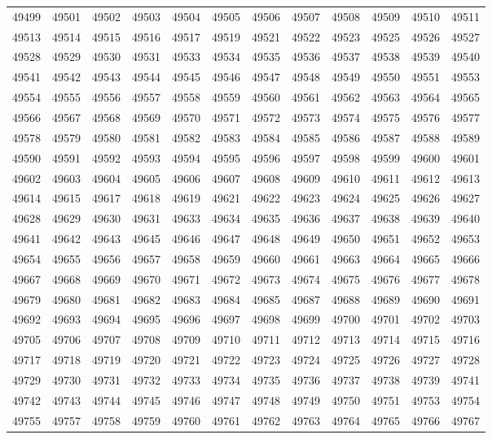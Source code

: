 \begin{center}
\begin{longtable}{llllllllllll}
49499 &49501 &49502 &49503 &49504 &49505 &49506 &49507 &49508 &49509 &49510 &49511 \\
49513 &49514 &49515 &49516 &49517 &49519 &49521 &49522 &49523 &49525 &49526 &49527 \\
49528 &49529 &49530 &49531 &49533 &49534 &49535 &49536 &49537 &49538 &49539 &49540 \\
49541 &49542 &49543 &49544 &49545 &49546 &49547 &49548 &49549 &49550 &49551 &49553 \\
49554 &49555 &49556 &49557 &49558 &49559 &49560 &49561 &49562 &49563 &49564 &49565 \\
49566 &49567 &49568 &49569 &49570 &49571 &49572 &49573 &49574 &49575 &49576 &49577 \\
49578 &49579 &49580 &49581 &49582 &49583 &49584 &49585 &49586 &49587 &49588 &49589 \\
49590 &49591 &49592 &49593 &49594 &49595 &49596 &49597 &49598 &49599 &49600 &49601 \\
49602 &49603 &49604 &49605 &49606 &49607 &49608 &49609 &49610 &49611 &49612 &49613 \\
49614 &49615 &49617 &49618 &49619 &49621 &49622 &49623 &49624 &49625 &49626 &49627 \\
49628 &49629 &49630 &49631 &49633 &49634 &49635 &49636 &49637 &49638 &49639 &49640 \\
49641 &49642 &49643 &49645 &49646 &49647 &49648 &49649 &49650 &49651 &49652 &49653 \\
49654 &49655 &49656 &49657 &49658 &49659 &49660 &49661 &49663 &49664 &49665 &49666 \\
49667 &49668 &49669 &49670 &49671 &49672 &49673 &49674 &49675 &49676 &49677 &49678 \\
49679 &49680 &49681 &49682 &49683 &49684 &49685 &49687 &49688 &49689 &49690 &49691 \\
49692 &49693 &49694 &49695 &49696 &49697 &49698 &49699 &49700 &49701 &49702 &49703 \\
49705 &49706 &49707 &49708 &49709 &49710 &49711 &49712 &49713 &49714 &49715 &49716 \\
49717 &49718 &49719 &49720 &49721 &49722 &49723 &49724 &49725 &49726 &49727 &49728 \\
49729 &49730 &49731 &49732 &49733 &49734 &49735 &49736 &49737 &49738 &49739 &49741 \\
49742 &49743 &49744 &49745 &49746 &49747 &49748 &49749 &49750 &49751 &49753 &49754 \\
49755 &49757 &49758 &49759 &49760 &49761 &49762 &49763 &49764 &49765 &49766 &49767 \\

\end{longtable}
\end{center}
